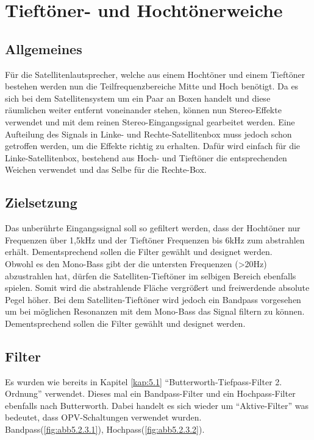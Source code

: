 \newpage
\section{Tieftöner- und Hochtönerweiche}\label{kap:5.2}
\subsection{Allgemeines}\label{kap:5.2.1}
Für die Satellitenlautsprecher, welche aus einem Hochtöner und einem Tieftöner bestehen werden nun die Teilfrequenzbereiche Mitte und Hoch benötigt. Da es sich bei dem Satellitensystem um ein Paar an Boxen handelt und diese räumlichen weiter entfernt voneinander stehen, können nun Stereo-Effekte verwendet und mit dem reinen Stereo-Eingangssignal gearbeitet werden. Eine Aufteilung des Signals in Linke- und Rechte-Satellitenbox muss jedoch schon getroffen werden, um die Effekte richtig zu erhalten. Dafür wird einfach für die Linke-Satellitenbox, bestehend aus Hoch- und Tieftöner die entsprechenden Weichen verwendet und das Selbe für die Rechte-Box.

\subsection{Zielsetzung}\label{kap:5.2.2}
Das unberührte Eingangssignal soll so gefiltert werden, dass der Hochtöner nur Frequenzen über 1,5kHz und der Tieftöner Frequenzen bis 6kHz zum abstrahlen erhält. Dementsprechend sollen die Filter gewählt und designet werden.\\
Obwohl es den Mono-Bass gibt der die untersten Frequenzen (>20Hz) abzustrahlen hat, dürfen die Satelliten-Tieftöner im selbigen Bereich ebenfalls spielen. Somit wird die abstrahlende Fläche vergrößert und freiwerdende absolute Pegel höher. Bei dem Satelliten-Tieftöner wird jedoch ein Bandpass vorgesehen um bei möglichen Resonanzen mit dem Mono-Bass das Signal filtern zu können.\\
Dementsprechend sollen die Filter gewählt und designet werden.

\subsection{Filter}\label{kap:5.2.3}
Es wurden wie bereits in Kapitel \ref{kap:5.1} \enquote{Butterworth-Tiefpass-Filter 2. Ordnung} verwendet. Dieses mal ein Bandpass-Filter und ein Hochpass-Filter ebenfalls nach Butterworth. Dabei handelt es sich wieder um \enquote{Aktive-Filter} was bedeutet, dass OPV-Schaltungen verwendet wurden.\\
Bandpass(\ref{fig:abb5.2.3.1}), Hochpass(\ref{fig:abb5.2.3.2}).\\

